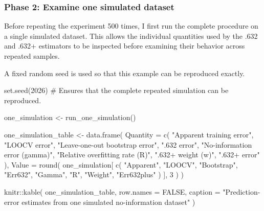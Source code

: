 \documentclass[
  letterpaper,
  DIV=11,
  numbers=noendperiod]{scrreprt}
\newenvironment{Shaded}{\begin{snugshade}}{\end{snugshade}}
\newcommand{\AttributeTok}[1]{\textcolor[rgb]{0.40,0.45,0.13}{#1}}
\newcommand{\CommentTok}[1]{\textcolor[rgb]{0.37,0.37,0.37}{#1}}
\newcommand{\ConstantTok}[1]{\textcolor[rgb]{0.56,0.35,0.01}{#1}}
\newcommand{\DecValTok}[1]{\textcolor[rgb]{0.68,0.00,0.00}{#1}}
\newcommand{\FunctionTok}[1]{\textcolor[rgb]{0.28,0.35,0.67}{#1}}
\newcommand{\NormalTok}[1]{\textcolor[rgb]{0.00,0.23,0.31}{#1}}
\newcommand{\OtherTok}[1]{\textcolor[rgb]{0.00,0.23,0.31}{#1}}
\newcommand{\SpecialCharTok}[1]{\textcolor[rgb]{0.37,0.37,0.37}{#1}}
\newcommand{\StringTok}[1]{\textcolor[rgb]{0.13,0.47,0.30}{#1}}
\begin{document}
\subsubsection{Phase 2: Examine one simulated
dataset}\label{phase-2-examine-one-simulated-dataset}

Before repeating the experiment 500 times, I first run the complete
procedure on a single simulated dataset. This allows the individual
quantities used by the .632 and .632+ estimators to be inspected before
examining their behavior across repeated samples.

A fixed random seed is used so that this example can be reproduced
exactly.

\begin{Shaded}
\begin{Highlighting}[]
\FunctionTok{set.seed}\NormalTok{(}\DecValTok{2026}\NormalTok{)}
\CommentTok{\# Ensures that the complete repeated simulation can be reproduced.}

\NormalTok{one\_simulation }\OtherTok{\textless{}{-}} \FunctionTok{run\_one\_simulation}\NormalTok{()}

\NormalTok{one\_simulation\_table }\OtherTok{\textless{}{-}} \FunctionTok{data.frame}\NormalTok{(}
  \AttributeTok{Quantity =} \FunctionTok{c}\NormalTok{(}
    \StringTok{"Apparent training error"}\NormalTok{,}
    \StringTok{"LOOCV error"}\NormalTok{,}
    \StringTok{"Leave{-}one{-}out bootstrap error"}\NormalTok{,}
    \StringTok{".632 error"}\NormalTok{,}
    \StringTok{"No{-}information error (gamma)"}\NormalTok{,}
    \StringTok{"Relative overfitting rate (R)"}\NormalTok{,}
    \StringTok{".632+ weight (w)"}\NormalTok{,}
    \StringTok{".632+ error"}
\NormalTok{  ),}
  \AttributeTok{Value =} \FunctionTok{round}\NormalTok{(}
\NormalTok{    one\_simulation[}
      \FunctionTok{c}\NormalTok{(}
        \StringTok{"Apparent"}\NormalTok{,}
        \StringTok{"LOOCV"}\NormalTok{,}
        \StringTok{"Bootstrap"}\NormalTok{,}
        \StringTok{"Err632"}\NormalTok{,}
        \StringTok{"Gamma"}\NormalTok{,}
        \StringTok{"R"}\NormalTok{,}
        \StringTok{"Weight"}\NormalTok{,}
        \StringTok{"Err632plus"}
\NormalTok{      )}
\NormalTok{    ],}
    \DecValTok{3}
\NormalTok{  )}
\NormalTok{)}

\NormalTok{knitr}\SpecialCharTok{::}\FunctionTok{kable}\NormalTok{(}
\NormalTok{  one\_simulation\_table,}
  \AttributeTok{row.names =} \ConstantTok{FALSE}\NormalTok{,}
  \AttributeTok{caption =} \StringTok{"Prediction{-}error estimates from one simulated no{-}information dataset"}
\NormalTok{)}
\end{Highlighting}
\end{Shaded}
\end{document}
